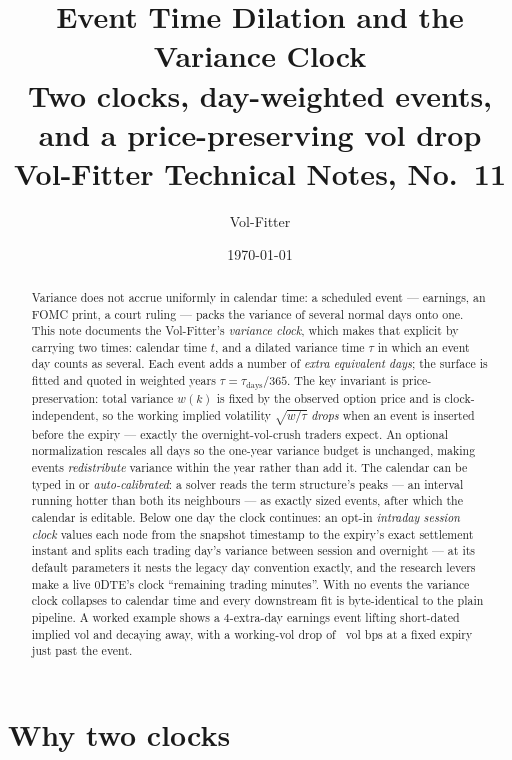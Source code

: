 \documentclass[11pt]{article}
\title{\textbf{Event Time Dilation and the Variance Clock}\\[2pt]
\large Two clocks, day-weighted events, and a price-preserving vol drop\\[2pt]
\normalsize Vol-Fitter Technical Notes, No.~11}
\author{Vol-Fitter}
\date{\today}
\begin{document}
\maketitle


\begin{abstract}
Variance does not accrue uniformly in calendar time: a scheduled event ---
earnings, an FOMC print, a court ruling --- packs the variance of several normal
days onto one. This note documents the Vol-Fitter's \emph{variance clock}, which
makes that explicit by carrying two times: calendar time $t$, and a dilated
variance time $\tau$ in which an event day counts as several. Each event adds a
number of \emph{extra equivalent days}; the surface is fitted and quoted in
weighted years $\tau=\tau_{\text{days}}/365$. The key invariant is
price-preservation: total variance $w(k)$ is fixed by the observed option price
and is clock-independent, so the working implied volatility $\sqrt{w/\tau}$
\emph{drops} when an event is inserted before the expiry --- exactly the
overnight-vol-crush traders expect. An optional normalization rescales all days so
the one-year variance budget is unchanged, making events \emph{redistribute}
variance within the year rather than add it. The calendar can be typed in or
\emph{auto-calibrated}: a solver reads the term structure's peaks --- an
interval running hotter than both its neighbours --- as exactly sized events,
after which the calendar is editable. Below one day the clock
continues: an opt-in \emph{intraday session clock} values each node from the
snapshot timestamp to the expiry's exact settlement instant and splits each
trading day's variance between session and overnight --- at its default
parameters it nests the legacy day convention exactly, and the research
levers make a live 0DTE's clock ``remaining trading minutes''. With no
events the variance clock collapses to calendar time and every downstream
fit is byte-identical to the plain pipeline. A worked example shows a
$4$-extra-day earnings event lifting short-dated implied vol and decaying
away, with a working-vol drop of \evtdropbp\ vol bps at a fixed expiry just
past the event.
\end{abstract}

\tableofcontents
\newpage

\section{Why two clocks}
\label{sec:why}
\end{document}
